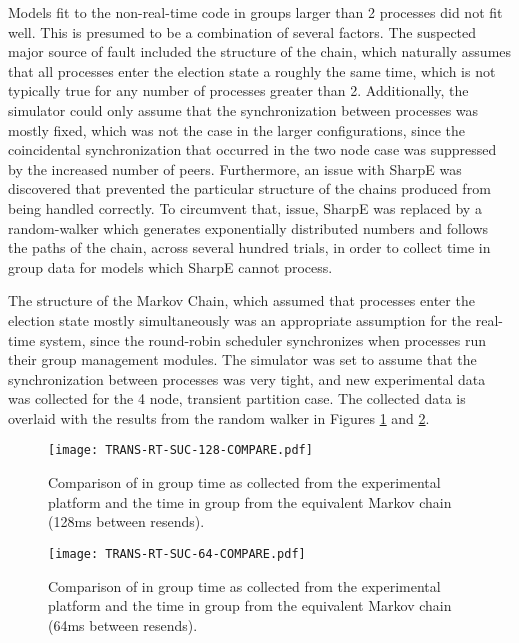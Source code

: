 Models fit to the non-real-time code in groups larger than 2 processes did not fit well.
This is presumed to be a combination of several factors. The suspected major source of fault
included the structure of the chain, which naturally assumes that all processes enter the
election state a roughly the same time, which is not typically true for any number of processes
greater than 2. Additionally, the simulator could only assume that the synchronization between
processes was mostly fixed, which was not the case in the larger configurations, since the
coincidental synchronization that occurred in the two node case was suppressed by the increased
number of peers. Furthermore, an issue with SharpE was discovered that prevented the
particular structure of the chains produced from being handled correctly. To circumvent that,
issue, SharpE was replaced by a random-walker which generates exponentially distributed numbers
and follows the paths of the chain, across several hundred trials, in order to collect time in group data for
models which SharpE cannot process.

The structure of the Markov Chain, which assumed that processes enter the election state
mostly simultaneously was an appropriate assumption for the real-time system, since the
round-robin scheduler synchronizes when processes run their group management modules. The
simulator was set to assume that the synchronization between processes was very tight, and
new experimental data was collected for the 4 node, transient partition case. The collected
data is overlaid with the results from the random walker in Figures \ref{fig:COMPARE-SUC-TRANS-RT-128} and \ref{fig:COMPARE-SUC-TRANS-RT-64}.

\begin{figure}[!h]
\centering
\texttt{[image: TRANS-RT-SUC-128-COMPARE.pdf]}

\caption{Comparison of in group time as collected from the experimental platform and the time in group from the equivalent Markov chain (128ms between resends).}
\label{fig:COMPARE-SUC-TRANS-RT-128}
\end{figure}

\begin{figure}[!h]
\centering
\texttt{[image: TRANS-RT-SUC-64-COMPARE.pdf]}

\caption{Comparison of in group time as collected from the experimental platform and the time in group from the equivalent Markov chain (64ms between resends).}
\label{fig:COMPARE-SUC-TRANS-RT-64}
\end{figure}

